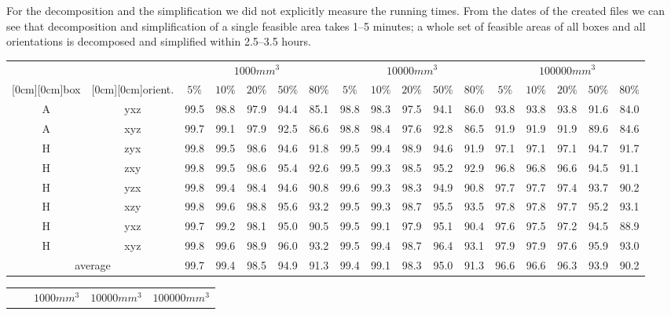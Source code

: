 \documentclass{article}
\begin{document}
For the decomposition and the simplification we did not explicitly
measure the running times. From the dates of the created files we can
see that decomposition and simplification of a single feasible area
takes 1--5 minutes; a whole set of feasible areas of all boxes and all
orientations is decomposed and simplified within 2.5--3.5 hours.

\begin{table}[t]
\center
\begin{tabular}{|cc|ccccc|ccccc|ccccc|}
\hline
& & \multicolumn{5}{|c|}{$1000 mm^3$} & \multicolumn{5}{|c|}{$10000 mm^3$} & \multicolumn{5}{|c|}{$100000 mm^3$} \\
\raisebox{1.4ex}[0cm][0cm]{box} &
\raisebox{1.4ex}[0cm][0cm]{orient.} & 
$5\%$ & $10\%$ & $20\%$ & $50\%$ & $80\%$ & $5\%$ & $10\%$ & $20\%$ & $50\%$ & $80\%$
& $5\%$ & $10\%$ & $20\%$ & $50\%$ & $80\%$ \\
\hline
A & yxz & 99.5 & 98.8 & 97.9 & 94.4 & 85.1 & 98.8 & 98.3 & 97.5 & 94.1 & 86.0 & 93.8 & 93.8 & 93.8 & 91.6 & 84.0 \\
A & xyz & 99.7 & 99.1 & 97.9 & 92.5 & 86.6 & 98.8 & 98.4 & 97.6 & 92.8 & 86.5 & 91.9 & 91.9 & 91.9 & 89.6 & 84.6 \\
H & zyx & 99.8 & 99.5 & 98.6 & 94.6 & 91.8 & 99.5 & 99.4 & 98.9 & 94.6 & 91.9 & 97.1 & 97.1 & 97.1 & 94.7 & 91.7 \\
H & zxy & 99.8 & 99.5 & 98.6 & 95.4 & 92.6 & 99.5 & 99.3 & 98.5 & 95.2 & 92.9 & 96.8 & 96.8 & 96.6 & 94.5 & 91.1 \\
H & yzx & 99.8 & 99.4 & 98.4 & 94.6 & 90.8 & 99.6 & 99.3 & 98.3 & 94.9 & 90.8 & 97.7 & 97.7 & 97.4 & 93.7 & 90.2 \\
H & xzy & 99.8 & 99.6 & 98.8 & 95.6 & 93.2 & 99.5 & 99.3 & 98.7 & 95.5 & 93.5 & 97.8 & 97.8 & 97.7 & 95.2 & 93.1 \\
H & yxz & 99.7 & 99.2 & 98.1 & 95.0 & 90.5 & 99.5 & 99.1 & 97.9 & 95.1 & 90.4 & 97.6 & 97.5 & 97.2 & 94.5 & 88.9 \\
H & xyz & 99.8 & 99.6 & 98.9 & 96.0 & 93.2 & 99.5 & 99.4 & 98.7 & 96.4 & 93.1 & 97.9 & 97.9 & 97.6 & 95.9 & 93.0 \\
\hline
\multicolumn{2}{|c|}{average} 
& 99.7 & 99.4 & 98.5 & 94.9 & 91.3 
& 99.4 & 99.1 & 98.3 & 95.0 & 91.3 
& 96.6 & 96.6 & 96.3 & 93.9 & 90.2 \\
\hline
\end{tabular}
\vspace{3mm}
\begin{tabular}{|cc|ccccc|ccccc|ccccc|}
\hline
& & \multicolumn{5}{|c|}{$1000 mm^3$} & \multicolumn{5}{|c|}{$10000 mm^3$} & \multicolumn{5}{|c|}{$100000 mm^3$} \\

\end{tabular}
\end{table}
\end{document}
